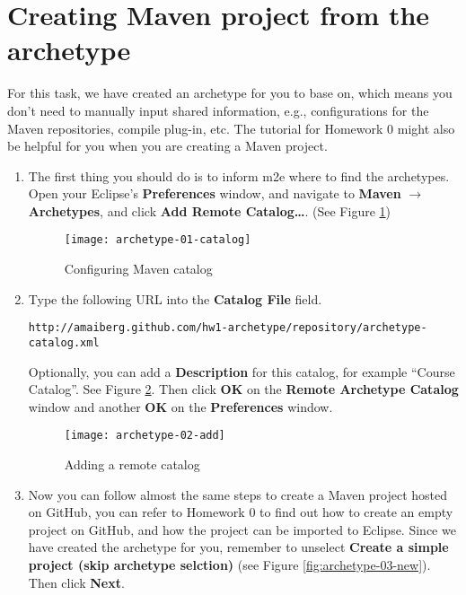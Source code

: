 
\section{Creating Maven project from the archetype}

For this task, we have created an archetype for you to base on, which means you
don't need to manually input shared information, e.g., configurations for the
Maven repositories, compile plug-in, etc. The tutorial for Homework 0 might also
be helpful for you when you are creating a Maven project.

\begin{enumerate}

\item The first thing you should do is to inform m2e where to find the
archetypes. Open your Eclipse's \textbf{Preferences} window, and navigate to
\textbf{Maven} $\rightarrow$ \textbf{Archetypes}, and click \textbf{Add Remote
Catalog\ldots}. (See Figure \ref{fig:archetype-01-catalog})

\begin{figure}[t]
\centering
\texttt{[image: archetype-01-catalog]}
\caption{Configuring Maven catalog\label{fig:archetype-01-catalog}}
\end{figure}

\item Type the following URL into the \textbf{Catalog File} field.

\begin{verbatim}
http://amaiberg.github.com/hw1-archetype/repository/archetype-catalog.xml
\end{verbatim}

Optionally, you can add a \textbf{Description} for this catalog, for example
``Course Catalog''. See Figure \ref{fig:archetype-02-add}. Then click
\textbf{OK} on the \textbf{Remote Archetype Catalog} window and another
\textbf{OK} on the \textbf{Preferences} window.

\begin{figure}[t]
\centering
\texttt{[image: archetype-02-add]}
\caption{Adding a remote catalog\label{fig:archetype-02-add}}
\end{figure}

\item Now you can follow almost the same steps to create a Maven project hosted
on GitHub, you can refer to Homework 0 to find out how to create an empty
project on GitHub, and how the project can be imported to Eclipse. Since we have
created the archetype for you, remember to unselect \textbf{Create a simple
project (skip archetype selction)} (see Figure \ref{fig:archetype-03-new}). Then
click \textbf{Next}.
 

\end{enumerate}
